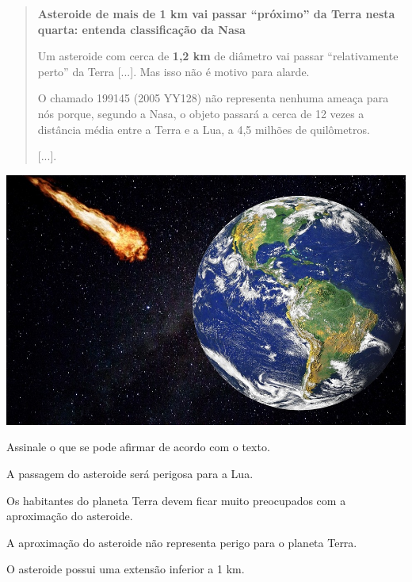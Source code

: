 \begin{minipage}{.5\textwidth}
\begin{quote}
\textbf{Asteroide de mais de 1 km vai passar “próximo” da Terra nesta
quarta: entenda classificação da Nasa}

Um asteroide com cerca de \textbf{1,2 km} de diâmetro vai passar
“relativamente perto” da Terra {[}...{]}. Mas
isso não é motivo para alarde.

O chamado 199145 (2005 YY128) não representa nenhuma ameaça para nós
porque, segundo a Nasa, o
objeto passará a cerca de 12 vezes a distância média entre a Terra e a
Lua, a 4,5 milhões de quilômetros.

{[}...{]}.
\end{quote}
\end{minipage}\hspace{.2cm}
\begin{minipage}{.5\textwidth}
\includegraphics[width=\textwidth]{./imgs/img3.jpg}
\end{minipage}



Assinale o que se pode afirmar de acordo com o texto.

\begin{escolha}
\item A passagem do asteroide será perigosa para a Lua.

\item Os habitantes do planeta Terra devem ficar muito preocupados com a
aproximação do asteroide.

\item A aproximação do asteroide não representa perigo para o planeta
Terra.

\item O asteroide possui uma extensão inferior a 1 km.
\end{escolha}

